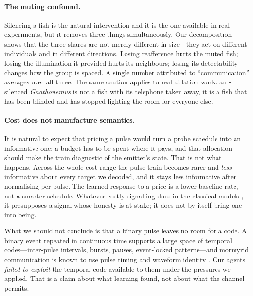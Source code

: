 \paragraph{The muting confound.}
Silencing a fish is the natural intervention and it is the one available in real
experiments, but it removes three things simultaneously. Our decomposition shows
that the three shares are not merely different in size---they act on different
individuals and in different directions. Losing reafference hurts the muted fish;
losing the illumination it provided hurts its neighbours; losing its detectability
changes how the group is spaced. A single number attributed to ``communication''
averages over all three. The same caution applies to real ablation work: an
\eod-silenced \emph{Gnathonemus} is not a fish with its telephone taken away, it is
a fish that has been blinded and has stopped lighting the room for everyone else.

\paragraph{Cost does not manufacture semantics.}
It is natural to expect that pricing a pulse would turn a probe schedule into an
informative one: a budget has to be spent where it pays, and that allocation
should make the train diagnostic of the emitter's state. That is not what
happens. Across the whole cost range the pulse train becomes rarer and
\emph{less} informative about every target we decoded, and it stays less
informative after normalising per pulse. The learned response to a price is a
lower baseline rate, not a smarter schedule. Whatever costly signalling does in
the classical models
\citep{zahavi1975mate,grafen1990biological,szamado2011cost}, it presupposes a
signal whose honesty is at stake; it does not by itself bring one into being.

What we should not conclude is that a binary pulse leaves no room for a code. A
binary event repeated in continuous time supports a large space of temporal
codes---inter-pulse intervals, bursts, pauses, event-locked patterns---and
mormyrid communication is known to use pulse timing and waveform identity
\citep{baker2013multiplexed,carlson2004stereotyped,hopkins1988neuroethology}. Our
agents \emph{failed to exploit} the temporal code available to them under the
pressures we applied. That is a claim about what learning found, not about what
the channel permits.

